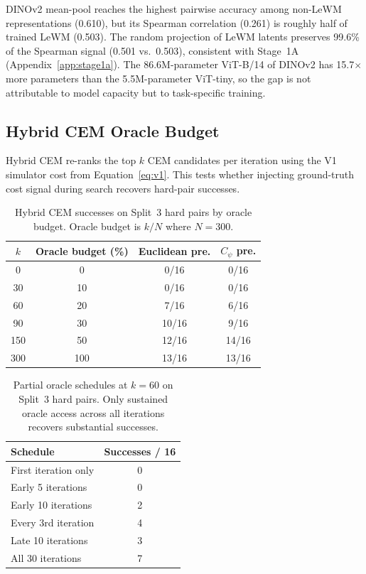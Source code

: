 DINOv2 mean-pool reaches the highest pairwise accuracy among non-LeWM
representations (0.610), but its Spearman correlation (0.261) is roughly
half of trained LeWM (0.503).  The random projection of LeWM latents
preserves 99.6\% of the Spearman signal (0.501 vs.\ 0.503), consistent
with Stage~1A (Appendix~\ref{app:stage1a}).  The 86.6M-parameter
ViT-B/14 of DINOv2 has 15.7$\times$ more parameters than the 5.5M-parameter
ViT-tiny, so the gap is not attributable to model capacity but to
task-specific training.

\subsection{Hybrid CEM Oracle Budget}
\label{app:negative_hybrid}

Hybrid CEM re-ranks the top $k$ CEM candidates per iteration using the V1
simulator cost from Equation~\ref{eq:v1}.  This tests whether injecting
ground-truth cost signal during search recovers hard-pair successes.

\begin{table}[h]
\centering
\caption{Hybrid CEM successes on Split~3 hard pairs by oracle budget.
Oracle budget is $k/N$ where $N=300$.}
\label{tab:h-oracle-split3}
\small
\begin{tabular}{cccc}
\toprule
$k$ & Oracle budget (\%) & Euclidean pre. & $C_\psi$ pre. \\
\midrule
0 & 0 & 0/16 & 0/16 \\
30 & 10 & 0/16 & 0/16 \\
60 & 20 & 7/16 & 6/16 \\
90 & 30 & 10/16 & 9/16 \\
150 & 50 & 12/16 & 14/16 \\
300 & 100 & 13/16 & 13/16 \\
\bottomrule
\end{tabular}
\end{table}

\begin{table}[h]
\centering
\caption{Partial oracle schedules at $k=60$ on Split~3 hard pairs.  Only
sustained oracle access across all iterations recovers substantial
successes.}
\label{tab:h-oracle-partial}
\small
\begin{tabular}{lc}
\toprule
Schedule & Successes / 16 \\
\midrule
First iteration only & 0 \\
Early 5 iterations & 0 \\
Early 10 iterations & 2 \\
Every 3rd iteration & 4 \\
Late 10 iterations & 3 \\
All 30 iterations & 7 \\
\bottomrule
\end{tabular}
\end{table}

